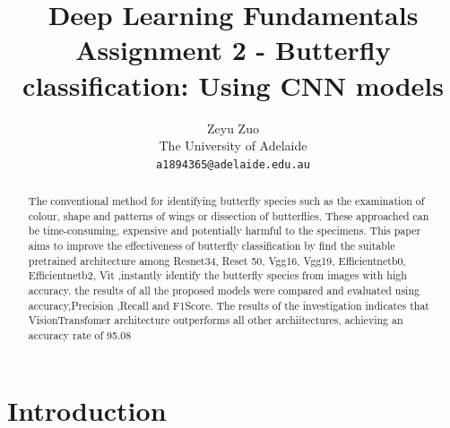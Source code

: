 \documentclass[10pt,twocolumn,letterpaper]{article}
\begin{document}
\title{Deep Learning Fundamentals\\
	Assignment 2 - Butterfly classification: Using CNN models}

\author{Zeyu Zuo\\
The University of Adelaide\\
{\tt\small a1894365@adelaide.edu.au}}
\maketitle

\begin{abstract}
The conventional method for identifying butterfly species such as the examination of colour, 
shape and patterns of wings or dissection of butterflies. These approached can be 
time-consuming, expensive and potentially harmful to the specimens. 
This paper aims to improve
the effectiveness of butterfly classification by find the suitable pretrained architecture among Resnet34, Reset 50, Vgg16, Vgg19, Efficientnetb0, Efficientnetb2, Vit
,instantly identify the butterfly species from images with high accuracy. 
the results of all the proposed models were compared and evaluated using accuracy,Precision ,Recall and F1Score. 
The results of the investigation indicates that VisionTransfomer architecture outperforms all other archiitectures, achieving an accuracy rate of 95.08%
\end{abstract}

\section{Introduction}
\label{sec:intro}
\end{document}
